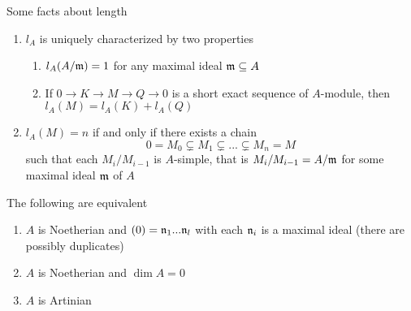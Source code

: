 \begin{remark}
	Some facts about length
	\begin{enumerate}
		\item $l_A$ is uniquely characterized by two properties
		\begin{enumerate}
			\item $l_A(A / \mathfrak{m}) = 1$ for any maximal ideal $\mathfrak{m} \subseteq A$
			\item If $0 \to K \to M \to Q \to 0$ is a short exact sequence of $A$-module, then $l_A(M) = l_A(K) + l_A(Q)$
		\end{enumerate}
		
		\item $l_A(M) = n$ if and only if there exists a chain
		$$
			0 = M_0 \subsetneq M_1 \subsetneq ... \subsetneq M_n = M
		$$
		such that each $M_i / M_{i-1}$ is $A$-simple, that is $M_i / M_{i-1} = A / \mathfrak{m}$ for some maximal ideal $\mathfrak{m}$ of $A$ 
	\end{enumerate}
\end{remark}

\begin{theorem}
	The following are equivalent
	\begin{enumerate}
		\item $A$ is Noetherian and $(0) = \mathfrak{n}_1 ... \mathfrak{n}_l$ with each $\mathfrak{n}_i$ is a maximal ideal (there are possibly duplicates)
		\item $A$ is Noetherian and $\dim A = 0$
		\item $A$ is Artinian
	\end{enumerate}
\end{theorem}

